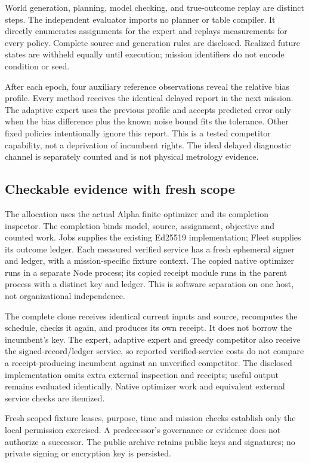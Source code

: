 \documentclass[11pt]{article}
\begin{document}
World generation, planning, model checking, and true-outcome replay are distinct steps. The independent evaluator imports no planner or table compiler. It directly enumerates assignments for the expert and replays measurements for every policy. Complete source and generation rules are disclosed. Realized future states are withheld equally until execution; mission identifiers do not encode condition or seed.

After each epoch, four auxiliary reference observations reveal the relative bias profile. Every method receives the identical delayed report in the next mission. The adaptive expert uses the previous profile and accepts predicted error only when the bias difference plus the known noise bound fits the tolerance. Other fixed policies intentionally ignore this report. This is a tested competitor capability, not a deprivation of incumbent rights. The ideal delayed diagnostic channel is separately counted and is not physical metrology evidence.

\subsection{Checkable evidence with fresh scope}
The allocation uses the actual Alpha finite optimizer and its completion inspector. The completion binds model, source, assignment, objective and counted work. Jobs supplies the existing Ed25519 implementation; Fleet supplies its outcome ledger. Each measured verified service has a fresh ephemeral signer and ledger, with a mission-specific fixture context. The copied native optimizer runs in a separate Node process; its copied receipt module runs in the parent process with a distinct key and ledger. This is software separation on one host, not organizational independence.

The complete clone receives identical current inputs and source, recomputes the schedule, checks it again, and produces its own receipt. It does not borrow the incumbent's key. The expert, adaptive expert and greedy competitor also receive the signed-record/ledger service, so reported verified-service costs do not compare a receipt-producing incumbent against an unverified competitor. The disclosed implementation omits extra external inspection and receipts; useful output remains evaluated identically. Native optimizer work and equivalent external service checks are itemized.

Fresh scoped fixture leases, purpose, time and mission checks establish only the local permission exercised. A predecessor's governance or evidence does not authorize a successor. The public archive retains public keys and signatures; no private signing or encryption key is persisted.
\end{document}
